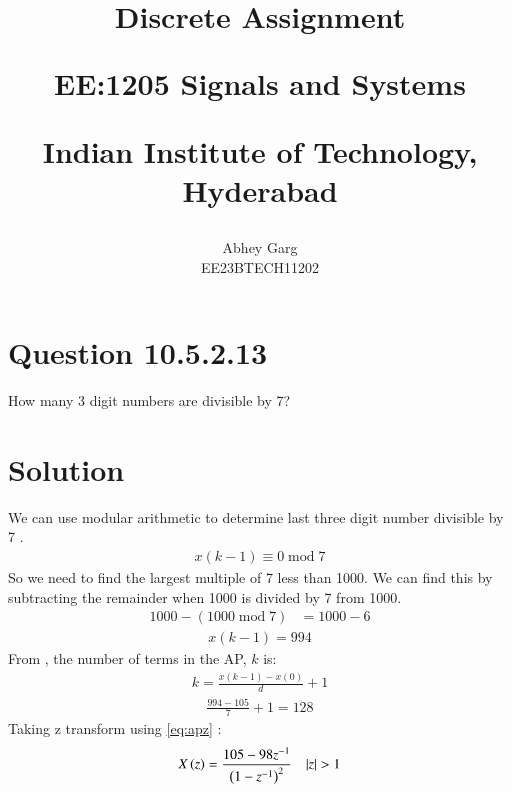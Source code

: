 \documentclass[journal,12pt,twocolumn]{IEEEtran}
\theoremstyle{remark}
\begin{document}
%




\vspace{3cm}

\title{
Discrete Assignment 

\large{EE:1205 Signals and Systems}

Indian Institute of Technology, Hyderabad
}
\author{Abhey Garg

EE23BTECH11202
}	


\maketitle

\newpage


\bigskip

\renewcommand{\thefigure}{\arabic{figure}}
\renewcommand{\thetable}{\arabic{table}}
\renewcommand{\theequation}{\arabic{equation}}

\section{Question 10.5.2.13}
How many 3 digit numbers are divisible by 7?
\section{Solution}
\fi



We can use modular arithmetic to determine last three digit number divisible by 7 . 
\begin{align}
x(k-1) \equiv 0  \; \text{mod}\; 7
\end{align}
So we need to find the largest multiple of 7 less than 1000. We can find this by subtracting the remainder when 1000 is divided by 7 from 1000.
\begin{align}
1000 - (1000 \; \text{mod}\;7) &= 1000-6
\end{align} 
\begin{align}
x(k-1) = 994
\end{align}
From , the number of terms in the AP, $k$ is:
\begin{align}
k = \frac{x(k-1)-x(0)}{d} + 1
\end{align}
\begin{align}
\frac{994 - 105}{7} + 1 = 128
\end{align}
Taking z transform  using  \ref{eq:apz} :
\begin{align}
 X\brak{z} = \frac{105 - 98z^{-1}}{\brak{1-z^{-1}}^2} \quad |z| > 1 
\end{align}
\end{document}
